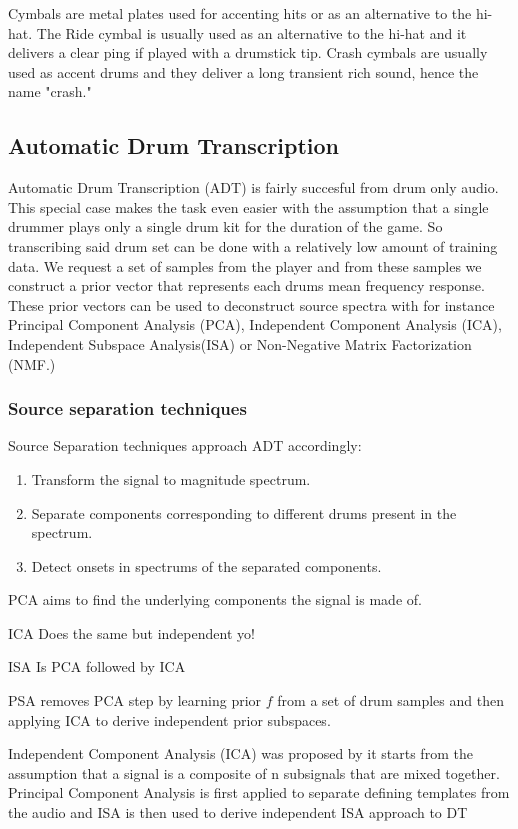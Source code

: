 \documentclass[10pt]{article}
\begin{document}
Cymbals are metal plates used for accenting hits or as an alternative to the hi-hat. The Ride cymbal is usually used as an alternative to the hi-hat and it delivers a clear ping if played with a drumstick tip. Crash cymbals are usually used as accent drums and they deliver a long transient rich sound, hence the name "crash."


\subsection{Automatic Drum Transcription}
Automatic Drum Transcription (ADT) is fairly succesful from drum only audio. This special case makes the task even easier with the assumption that a single drummer plays only a single drum kit for the duration of the game. So transcribing said drum set can be done with a relatively low amount of training data. We request a set of samples from the player and from these samples we construct a prior vector that represents each drums mean frequency response. These prior vectors can be used to deconstruct source spectra with for instance Principal Component Analysis (PCA), Independent Component Analysis (ICA), Independent Subspace Analysis(ISA) or Non-Negative Matrix Factorization (NMF.) 
\subsubsection{Source separation techniques}
Source Separation techniques approach ADT accordingly:
\begin{enumerate}
\item Transform the signal to magnitude spectrum.
\item Separate components corresponding to different drums present in the spectrum.
\item Detect onsets in spectrums of the separated components.
\end{enumerate}
PCA aims to find the underlying components the signal is made of. 

ICA Does the same but independent yo!

ISA Is PCA followed by ICA

PSA removes PCA step by learning prior $f$ from a set of drum samples and then applying ICA to derive independent prior subspaces.

Independent Component Analysis (ICA) was proposed by {} it starts from the assumption that a signal is a composite of n subsignals that are mixed together. Principal Component Analysis is first applied to separate defining templates from the audio and ISA is then used to derive independent ISA approach to DT 
\end{document}
